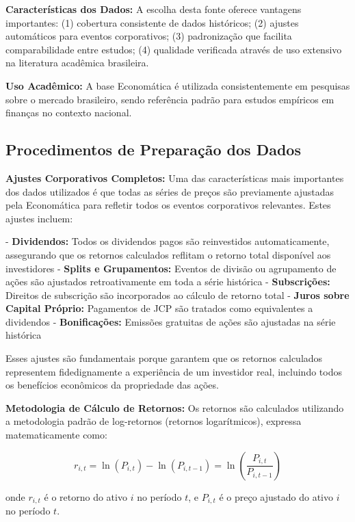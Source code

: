 \textbf{Características dos Dados:} A escolha desta fonte oferece vantagens importantes: (1) cobertura consistente de dados históricos; (2) ajustes automáticos para eventos corporativos; (3) padronização que facilita comparabilidade entre estudos; (4) qualidade verificada através de uso extensivo na literatura acadêmica brasileira.

\textbf{Uso Acadêmico:} A base Economática é utilizada consistentemente em pesquisas sobre o mercado brasileiro, sendo referência padrão para estudos empíricos em finanças no contexto nacional.

\subsection{Procedimentos de Preparação dos Dados}

\textbf{Ajustes Corporativos Completos:} Uma das características mais importantes dos dados utilizados é que todas as séries de preços são previamente ajustadas pela Economática para refletir todos os eventos corporativos relevantes. Estes ajustes incluem:

- \textbf{Dividendos:} Todos os dividendos pagos são reinvestidos automaticamente, assegurando que os retornos calculados reflitam o retorno total disponível aos investidores
- \textbf{Splits e Grupamentos:} Eventos de divisão ou agrupamento de ações são ajustados retroativamente em toda a série histórica
- \textbf{Subscrições:} Direitos de subscrição são incorporados ao cálculo de retorno total
- \textbf{Juros sobre Capital Próprio:} Pagamentos de JCP são tratados como equivalentes a dividendos
- \textbf{Bonificações:} Emissões gratuitas de ações são ajustadas na série histórica

Esses ajustes são fundamentais porque garantem que os retornos calculados representem fidedignamente a experiência de um investidor real, incluindo todos os benefícios econômicos da propriedade das ações.

\textbf{Metodologia de Cálculo de Retornos:} Os retornos são calculados utilizando a metodologia padrão de log-retornos (retornos logarítmicos), expressa matematicamente como:

\begin{equation}
r_{i,t} = \ln(P_{i,t}) - \ln(P_{i,t-1}) = \ln\left(\frac{P_{i,t}}{P_{i,t-1}}\right)
\end{equation}

onde $r_{i,t}$ é o retorno do ativo $i$ no período $t$, e $P_{i,t}$ é o preço ajustado do ativo $i$ no período $t$.

